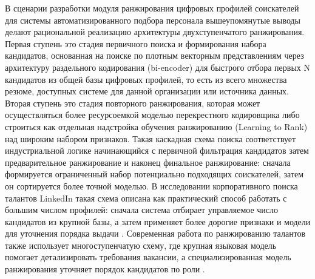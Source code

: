 В сценарии разработки модуля ранжирования цифровых профилей соискателей для системы автоматизированного подбора персонала вышеупомянутые выводы делают рациональной реализацию архитектуры двухступенчатого ранжирования. Первая ступень это стадия первичного поиска и формирования набора кандидатов, основанная на поиске по плотным векторным представлениям через архитектуру раздельного кодирования (bi-encoder) для быстрого отбора первых N кандидатов из общей базы цифровых профилей, то есть из всего множества резюме, доступных системе для данной организации или источника данных. Вторая ступень это стадия повторного ранжирования, которая может осуществляться более ресурсоемкой моделью перекрестного кодировщика либо строиться как отдельная надстройка обучения ранжированию (Learning to Rank) над широким набором признаков. Такая каскадная схема поиска соответствует индустриальной логике начинающийся с первичной фильтрация кандидатов затем предварительное ранжирование и наконец финальное ранжирование: сначала формируется ограниченный набор потенциально подходящих соискателей, затем он сортируется более точной моделью. В исследовании корпоративного поиска талантов LinkedIn такая схема описана как практический способ работать с большим числом профилей: сначала система отбирает управляемое число кандидатов из крупной базы, а затем применяет более дорогие признаки и модели для уточнения порядка выдачи \cite{src38}. Современная работа по ранжированию талантов также использует многоступенчатую схему, где крупная языковая модель помогает детализировать требования вакансии, а специализированная модель ранжирования уточняет порядок кандидатов по роли \cite{src17}.\par
